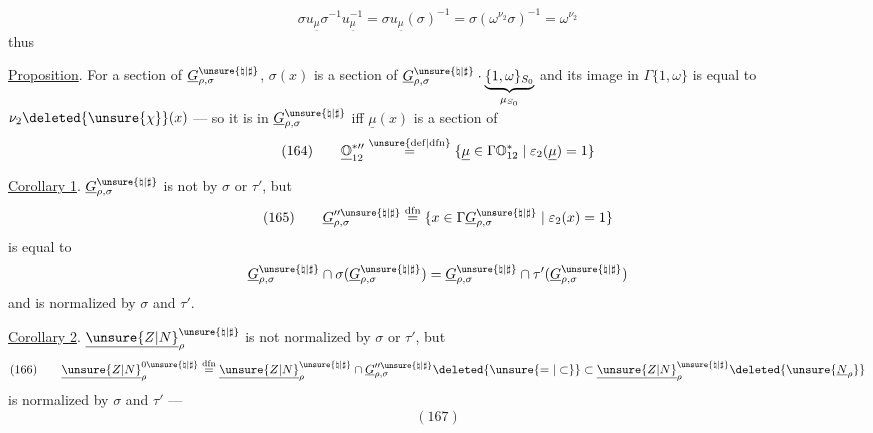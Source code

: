 
\[
\sigma u_{\underline\mu}\sigma^{-1}u_{\underline\mu}^{-1}
=\sigma u_{\underline\mu}(\sigma)^{-1}
=\sigma(\omega^{\nu_2}\sigma)^{-1}=\omega^{\nu_2}
\]
thus

\uline{Proposition}. For a section  of $\underline G_{\rho,\sigma}^{\unsure{\natural|\sharp}}$, \deleted{$\unsure{\sigma}$}
$\sigma(x)$ is a section of $\underline G_{\rho,\sigma}^{\unsure{\natural|\sharp}}\cdot\underbrace{\{1,\omega\}_{S_0}}_{\mu_{S_0}}$ and its image in $\Gamma\{1,\omega\}$ is equal to $\nu_2\deleted{\unsure{\chi}}(x)$ --- so it is in $\underline G_{\rho,\sigma}^{\unsure{\natural|\sharp}}$ iff $\underline\mu(x)$ is a section of
\[
(164)\qquad
\underline{\mathbb O}_{12}^{*\prime\prime}
\overset{\unsure{\mathrm{def}|\mathrm{dfn}}}{=}
\{\underline\mu\in\Gamma\mathbb O_{12}^*\mid\varepsilon_2(\underline\mu)=1\}
\]

\uline{Corollary 1}. $\underline G_{\rho,\sigma}^{\unsure{\natural|\sharp}}$ is not  by $\sigma$ or $\tau'$, but
\[
(165)\qquad
\underline G_{\rho,\sigma}^{\prime\prime\unsure{\natural|\sharp}}
\overset{\mathrm{dfn}}{=}
\{x\in\Gamma\underline G_{\rho,\sigma}^{\unsure{\natural|\sharp}}\mid\varepsilon_2(x)=1\}
\]
is equal to
\[
\underline G_{\rho,\sigma}^{\unsure{\natural|\sharp}}
\cap\sigma(\underline G_{\rho,\sigma}^{\unsure{\natural|\sharp}})
=\underline G_{\rho,\sigma}^{\unsure{\natural|\sharp}}
\cap\tau'(\underline G_{\rho,\sigma}^{\unsure{\natural|\sharp}})
\]
and is normalized by $\sigma$ and $\tau'$.

\uline{Corollary 2}. $\underline{\unsure{Z|N}}_\rho^{\unsure{\natural|\sharp}}$ is not normalized by $\sigma$ or $\tau'$, but
\[
(166)\qquad
\underline{\unsure{Z|N}}_\rho^{0\unsure{\natural|\sharp}}
\overset{\mathrm{dfn}}{=}
\underline{\unsure{Z|N}}_\rho^{\unsure{\natural|\sharp}}
\cap\underline G_{\rho,\sigma}^{\prime\prime\unsure{\natural|\sharp}}
\deleted{\unsure{=|\subset}}
\subset\underline{\unsure{Z|N}}_\rho^{\unsure{\natural|\sharp}}
\deleted{\unsure{\underline N_\rho}}
\]
is normalized by $\sigma$ and $\tau'$ --- 
\[
(167)
\]

